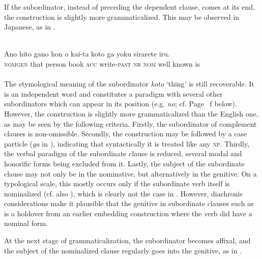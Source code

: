 If the subordinator, instead of preceding the dependent clause, comes at its end, the construction is slightly more grammaticalized. This may be observed in Japanese, as in .

\ea\label{ex:E28}
 \\
\gll Ano  hito  gano hon  o  kai-ta  koto  ga  yoku  sirarete  iru. \\
 \textsc{nomgen}    that  person    book  \textsc{acc}  write-\textsc{past}  \textsc{nr}  \textsc{nom}  well  known  is\\
\\
\z
\noindent The etymological meaning of the subordinator \textit{koto} ‘thing’ is still recoverable. It is an independent word and constitutes a paradigm with several other subordinators which can appear in its position (e.g. \textit{no}; cf. Page~\pageref{page74}\chk%
f  below). However, the construction is slightly more grammaticalized than the English one, as may be seen by the following criteria. Firstly, the subordinator of complement clauses is non-omissible. Secondly, the construction may be followed by a case particle (\textit{ga} in ), indicating that syntactically it is treated like any \textsc{np}. Thirdly, the verbal paradigm of the subordinate clause is reduced, several modal and honorific forms being excluded from it. Lastly, the subject of the subordinate clause may not only be in the nominative, but alternatively in the genitive. On a typological scale, this mostly occurs only if the subordinate verb itself is nominalized (cf. also \citealt[39]{Bossong1979}), which is clearly not the case in . However, diachronic considerations \citep[45--47]{Bossong1979} make it plausible that the genitive in subordinate clauses such as  is a holdover from an earlier embedding construction where the verb did have a nominal form.

At the next stage of grammaticalization, the subordinator becomes affixal, and the subject of the nominalized clause regularly goes into the genitive, as in .

